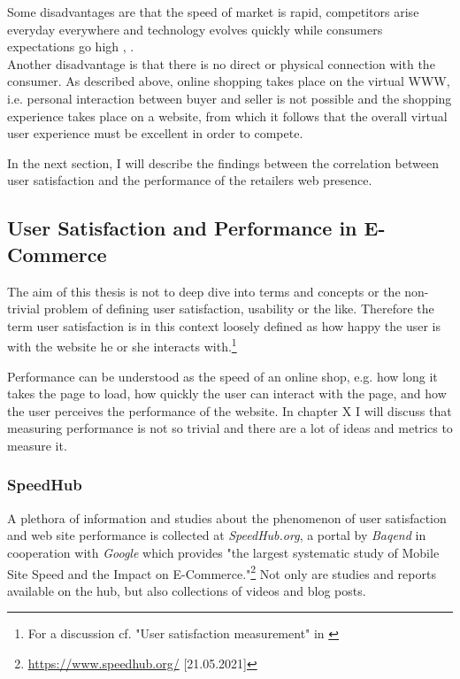 Some disadvantages are that the speed of market is rapid, competitors arise everyday everywhere and technology evolves quickly while consumers expectations go high \cite{2019Hermogeno}, \cite{2020Lang}.
\\

Another disadvantage is that there is no direct or physical connection with the consumer.
As described above, online shopping takes place on the virtual WWW, i.e. personal interaction between buyer and seller is not possible and the shopping experience takes place on a website, from which it follows that the overall virtual user experience must be excellent in order to compete.

In the next section, I will describe the findings between the correlation between user satisfaction and the performance of the retailers web presence.





\subsection{User Satisfaction and Performance in E-Commerce}
\label{chapter:user_satisfaction}

The aim of this thesis is not to deep dive into terms and concepts or the non-trivial problem of defining user satisfaction, usability or the like.
Therefore the term user satisfaction is in this context loosely defined as how happy the user is with the website he or she interacts with.\footnote{For a discussion cf. "User satisfaction measurement" in \cite{2010Islam}}

Performance can be understood as the speed of an online shop, e.g. how long it takes the page to load, how quickly the user can interact with the page, and how the user perceives the performance of the website.
In chapter X I will discuss that measuring performance is not so trivial and there are a lot of ideas and metrics to measure it. %


\subsubsection{SpeedHub}

A plethora of information and studies about the phenomenon of user satisfaction and web site performance is collected at \textit{SpeedHub.org}, a portal by \textit{Baqend} in cooperation with \textit{Google} which provides "the largest systematic study of Mobile Site Speed and the Impact on E-Commerce."\footnote{\url{https://www.speedhub.org/} [21.05.2021]}
Not only are studies and reports available on the hub, but also collections of videos and blog posts.

